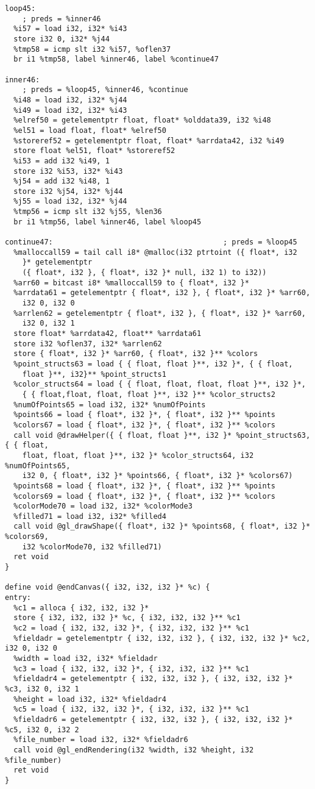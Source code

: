 \documentclass[main.tex]{subfiles}
\begin{document}
{\begin{lstlisting}
loop45:                                           
    ; preds = %inner46
  %i57 = load i32, i32* %i43
  store i32 0, i32* %j44
  %tmp58 = icmp slt i32 %i57, %oflen37
  br i1 %tmp58, label %inner46, label %continue47

inner46:                                          
    ; preds = %loop45, %inner46, %continue
  %i48 = load i32, i32* %j44
  %i49 = load i32, i32* %i43
  %elref50 = getelementptr float, float* %olddata39, i32 %i48
  %el51 = load float, float* %elref50
  %storeref52 = getelementptr float, float* %arrdata42, i32 %i49
  store float %el51, float* %storeref52
  %i53 = add i32 %i49, 1
  store i32 %i53, i32* %i43
  %j54 = add i32 %i48, 1
  store i32 %j54, i32* %j44
  %j55 = load i32, i32* %j44
  %tmp56 = icmp slt i32 %j55, %len36
  br i1 %tmp56, label %inner46, label %loop45

continue47:                                       ; preds = %loop45
  %malloccall59 = tail call i8* @malloc(i32 ptrtoint ({ float*, i32
    }* getelementptr
    ({ float*, i32 }, { float*, i32 }* null, i32 1) to i32))
  %arr60 = bitcast i8* %malloccall59 to { float*, i32 }*
  %arrdata61 = getelementptr { float*, i32 }, { float*, i32 }* %arr60,
    i32 0, i32 0
  %arrlen62 = getelementptr { float*, i32 }, { float*, i32 }* %arr60,
    i32 0, i32 1
  store float* %arrdata42, float** %arrdata61
  store i32 %oflen37, i32* %arrlen62
  store { float*, i32 }* %arr60, { float*, i32 }** %colors
  %point_structs63 = load { { float, float }**, i32 }*, { { float, 
    float }**, i32}** %point_structs1
  %color_structs64 = load { { float, float, float, float }**, i32 }*,
    { { float,float, float, float }**, i32 }** %color_structs2
  %numOfPoints65 = load i32, i32* %numOfPoints
  %points66 = load { float*, i32 }*, { float*, i32 }** %points
  %colors67 = load { float*, i32 }*, { float*, i32 }** %colors
  call void @drawHelper({ { float, float }**, i32 }* %point_structs63, { { float,
    float, float, float }**, i32 }* %color_structs64, i32 %numOfPoints65,
    i32 0, { float*, i32 }* %points66, { float*, i32 }* %colors67)
  %points68 = load { float*, i32 }*, { float*, i32 }** %points
  %colors69 = load { float*, i32 }*, { float*, i32 }** %colors
  %colorMode70 = load i32, i32* %colorMode3
  %filled71 = load i32, i32* %filled4
  call void @gl_drawShape({ float*, i32 }* %points68, { float*, i32 }* %colors69,
    i32 %colorMode70, i32 %filled71)
  ret void
}

define void @endCanvas({ i32, i32, i32 }* %c) {
entry:
  %c1 = alloca { i32, i32, i32 }*
  store { i32, i32, i32 }* %c, { i32, i32, i32 }** %c1
  %c2 = load { i32, i32, i32 }*, { i32, i32, i32 }** %c1
  %fieldadr = getelementptr { i32, i32, i32 }, { i32, i32, i32 }* %c2, i32 0, i32 0
  %width = load i32, i32* %fieldadr
  %c3 = load { i32, i32, i32 }*, { i32, i32, i32 }** %c1
  %fieldadr4 = getelementptr { i32, i32, i32 }, { i32, i32, i32 }* %c3, i32 0, i32 1
  %height = load i32, i32* %fieldadr4
  %c5 = load { i32, i32, i32 }*, { i32, i32, i32 }** %c1
  %fieldadr6 = getelementptr { i32, i32, i32 }, { i32, i32, i32 }* %c5, i32 0, i32 2
  %file_number = load i32, i32* %fieldadr6
  call void @gl_endRendering(i32 %width, i32 %height, i32 %file_number)
  ret void
}


\end{lstlisting}}
\end{document}
